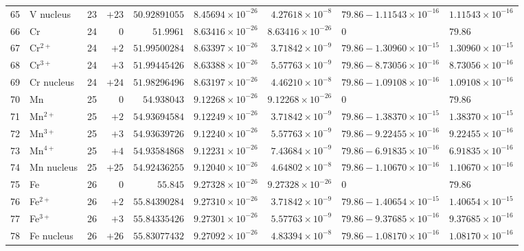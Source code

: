 {\begin{tabular}{@{}r l r r r r r l l@{}}
65 & V nucleus & 23 & $+23$ & $50.92891055$ & $8.45694{\times}10^{-26}$ & $4.27618{\times}10^{-8}$ & $79.86 - 1.11543{\times}10^{-16}$ & $1.11543{\times}10^{-16}$ \\
66 & Cr & 24 & $0$ & $51.9961$ & $8.63416{\times}10^{-26}$ & $8.63416{\times}10^{-26}$ & $0$ & $79.86$ \\
67 & Cr$^{2+}$ & 24 & $+2$ & $51.99500284$ & $8.63397{\times}10^{-26}$ & $3.71842{\times}10^{-9}$ & $79.86 - 1.30960{\times}10^{-15}$ & $1.30960{\times}10^{-15}$ \\
68 & Cr$^{3+}$ & 24 & $+3$ & $51.99445426$ & $8.63388{\times}10^{-26}$ & $5.57763{\times}10^{-9}$ & $79.86 - 8.73056{\times}10^{-16}$ & $8.73056{\times}10^{-16}$ \\
69 & Cr nucleus & 24 & $+24$ & $51.98296496$ & $8.63197{\times}10^{-26}$ & $4.46210{\times}10^{-8}$ & $79.86 - 1.09108{\times}10^{-16}$ & $1.09108{\times}10^{-16}$ \\
70 & Mn & 25 & $0$ & $54.938043$ & $9.12268{\times}10^{-26}$ & $9.12268{\times}10^{-26}$ & $0$ & $79.86$ \\
71 & Mn$^{2+}$ & 25 & $+2$ & $54.93694584$ & $9.12249{\times}10^{-26}$ & $3.71842{\times}10^{-9}$ & $79.86 - 1.38370{\times}10^{-15}$ & $1.38370{\times}10^{-15}$ \\
72 & Mn$^{3+}$ & 25 & $+3$ & $54.93639726$ & $9.12240{\times}10^{-26}$ & $5.57763{\times}10^{-9}$ & $79.86 - 9.22455{\times}10^{-16}$ & $9.22455{\times}10^{-16}$ \\
73 & Mn$^{4+}$ & 25 & $+4$ & $54.93584868$ & $9.12231{\times}10^{-26}$ & $7.43684{\times}10^{-9}$ & $79.86 - 6.91835{\times}10^{-16}$ & $6.91835{\times}10^{-16}$ \\
74 & Mn nucleus & 25 & $+25$ & $54.92436255$ & $9.12040{\times}10^{-26}$ & $4.64802{\times}10^{-8}$ & $79.86 - 1.10670{\times}10^{-16}$ & $1.10670{\times}10^{-16}$ \\
75 & Fe & 26 & $0$ & $55.845$ & $9.27328{\times}10^{-26}$ & $9.27328{\times}10^{-26}$ & $0$ & $79.86$ \\
76 & Fe$^{2+}$ & 26 & $+2$ & $55.84390284$ & $9.27310{\times}10^{-26}$ & $3.71842{\times}10^{-9}$ & $79.86 - 1.40654{\times}10^{-15}$ & $1.40654{\times}10^{-15}$ \\
77 & Fe$^{3+}$ & 26 & $+3$ & $55.84335426$ & $9.27301{\times}10^{-26}$ & $5.57763{\times}10^{-9}$ & $79.86 - 9.37685{\times}10^{-16}$ & $9.37685{\times}10^{-16}$ \\
78 & Fe nucleus & 26 & $+26$ & $55.83077432$ & $9.27092{\times}10^{-26}$ & $4.83394{\times}10^{-8}$ & $79.86 - 1.08170{\times}10^{-16}$ & $1.08170{\times}10^{-16}$ \\

\end{tabular}}

